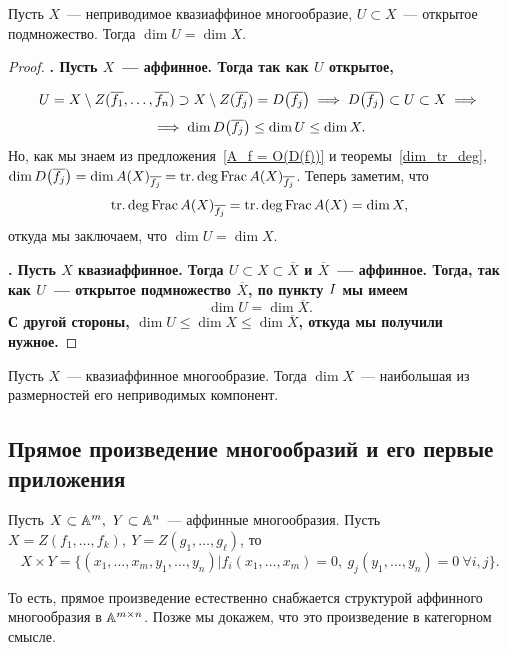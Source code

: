 	    \begin{statement} 
	    	Пусть $X$~--- неприводимое квазиаффиное многообразие, $U \subset X$~--- открытое подмножество. Тогда $\dim{U} = \dim{X}$.
	    \end{statement}
	    \begin{proof}
	    	\bf{.} Пусть $X$~--- аффинное. Тогда так как $U$ открытое, 

	    	\[
	    		U = X \setminus Z(\overline{f_1}, \ldots, \overline{f_n}) \supset X \setminus Z(\overline{f_j}) = D\lr*{\overline{f_j}} \implies D\lr*{\overline{f_j}} \subset U \subset X \implies 
	    	\]
	    	\[
	    		\implies \dim{D\lr*{\overline{f_j}}} \le \dim{U} \le \dim{X}.	
	    	\]	
	    	Но, как мы знаем из предложения~\ref{A_f = O(D(f))} и теоремы~\ref{dim_tr_deg}, $\dim{D\lr*{\overline{f_j}}} = \dim{A(X)_{\overline{f_j}}} = \Trdeg{\Frac{A(X)_{\overline{f_j}}}}$. Теперь заметим, что 
	    	\[
	    	 	\Trdeg{\Frac{A(X)_{\overline{f_j}}}} = \Trdeg{\Frac{A(X)}} = \dim{X}, 
	    	 \] 
	    	 откуда мы заключаем, что $\dim{U} = \dim{X}$.
	    		

	    	\bf{.} Пусть $X$ квазиаффинное. Тогда $U \subset X \subset \overline{X}$ и $\overline{X}$~--- аффинное. Тогда, так как $U$~--- открытое подмножество $\overline{X}$, по пункту $\RNum{1}$ мы имеем 
	    	\[
	    		\dim{U} = \dim{\overline{X}}.
	    	\]
	    	С другой стороны, $\dim{U} \le \dim{X} \le \dim{\overline{X}}$, откуда мы получили нужное. 
	    \end{proof}

	    \begin{definition} 
	    	Пусть $X$~--- квазиаффинное многообразие. Тогда $\dim{X}$~---  наибольшая из размерностей его неприводимых компонент. 
	    \end{definition}

	    \subsection{Прямое произведение многообразий и его первые приложения}

	    
    	Пусть $X \subset \AA^m, \ Y \subset \AA^n$~--- аффинные многообразия. Пусть $X = Z(f_1, \ldots, f_k), \ Y = Z(g_1, \ldots, g_{\ell})$, то 
    	\[
    		X \times Y = \{ (x_1, \ldots, x_m, y_1, \ldots, y_n) \vert f_i(x_1, \ldots, x_m) = 0, \ g_j(y_1, \ldots, y_n) = 0 \ \forall i, j \}.
    	\]

    	То есть, прямое произведение естественно снабжается структурой аффинного многообразия в $\AA^{m \times n}$. Позже мы докажем, что это произведение в категорном смысле. 

